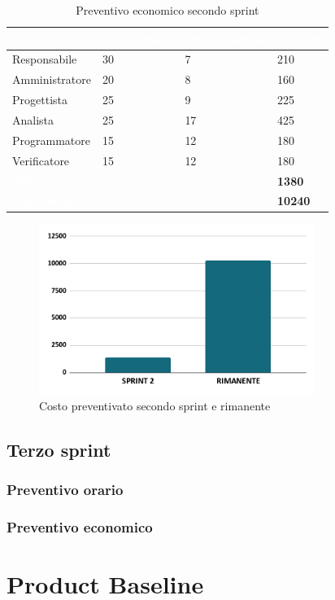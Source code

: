 {
\setlength{\tabcolsep}{10pt}
\renewcommand{\arraystretch}{1.5}
\begin{table}[h]
    \centering
    \begin{tabularx}{\textwidth}{| l | l | l | X |}
        \hline
        \rowcolor{headerrow} \textbf{\textcolor{white}{Ruolo}} & \textbf{\textcolor{white}{Costo orario}} & \textbf{\textcolor{white}{Ore impiegate}} & \textbf{\textcolor{white}{Costo €}} \\
        \hline
        Responsabile & 30 & 7 & 210\\
        \hline
        Amministratore & 20 & 8 & 160\\
        \hline
        Progettista& 25 & 9  & 225\\
        \hline
        Analista & 25 & 17  & 425\\
        \hline
        Programmatore & 15 & 12 & 180\\
        \hline
        Verificatore & 15 & 12  & 180\\
        \hline
        \cellcolor{headerrow} \textbf{\textcolor{white}{Totale}} &  &  & \textbf{1380}\\
        \hline
        \cellcolor{headerrow} \textbf{\textcolor{white}{Rimanente}} &  &  & \textbf{10240}\\
        \hline
    \end{tabularx}
    \caption{Preventivo economico secondo sprint}
    \label{tab:preventivocostisecondosprint}
\end{table}
}
{
\begin{figure}[h!]
    \centering
    \includegraphics[width=0.8\textwidth]{prev2costo.png}
    \caption{Costo preventivato secondo sprint e rimanente}
    \label{fig:preventivocostosecondosprint}
\end{figure}
}

\newpage
\subsection{Terzo sprint}

\subsubsection{Preventivo orario}

\subsubsection{Preventivo economico}

\section{Product Baseline}

\newpage